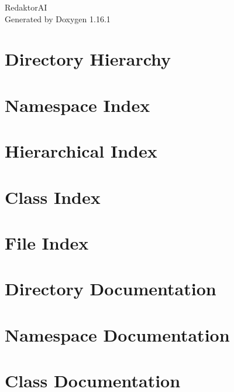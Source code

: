 \documentclass[twoside]{book}
\newcommand{\+}{\discretionary{\mbox{\scriptsize$\hookleftarrow$}}{}{}}
\newcommand{\clearemptydoublepage}{%
    \newpage{\pagestyle{empty}\cleardoublepage}%
  }
\begin{document}
  \raggedbottom
    \hypersetup{pageanchor=false,
                bookmarksnumbered=true,
                pdfencoding=unicode
               }
  \begin{titlepage}
  \vspace*{7cm}
  \begin{center}%
  {\Large Redaktor\+AI}\\
  \vspace*{1cm}
  {\large Generated by Doxygen 1.16.1}\\
  \end{center}
  \end{titlepage}
  \clearemptydoublepage
  \tableofcontents
  \clearemptydoublepage
  \hypersetup{pageanchor=true}
\chapter{Directory Hierarchy}

\chapter{Namespace Index}

\chapter{Hierarchical Index}

\chapter{Class Index}

\chapter{File Index}

\chapter{Directory Documentation}



\chapter{Namespace Documentation}

\chapter{Class Documentation}


\end{document}
